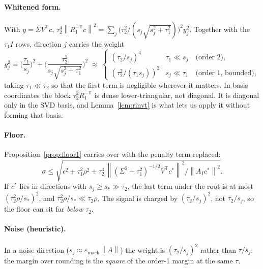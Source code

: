 \documentclass[11pt]{article}
\theoremstyle{definition}
\theoremstyle{remark}
\newcommand{\sig}{\sigma}
\newcommand{\eps}{\varepsilon_{\mathrm{mach}}}
\newcommand{\norm}[1]{\left\lVert #1 \right\rVert}
\newcommand{\AI}{A_I}
\begin{document}
\paragraph{Whitened form.} With $y = \Sigma V^{\mathsf T}c$,
$\tau_2^4\norm{R_1^{-\mathsf T}c}^2 = \sum_j \big(\tau_2^2/(s_j\sqrt{s_j^2+\tau_1^2})\big)^2 y_j^2$.
Together with the $\tau_1 I$ rows, direction $j$ carries the weight
\begin{equation}\label{eq:g2}
  g_j^2 = \Big(\frac{\tau_1}{s_j}\Big)^2
        + \Big(\frac{\tau_2^2}{s_j\sqrt{s_j^2+\tau_1^2}}\Big)^2
  \;\approx\;
  \begin{cases}
    (\tau_2/s_j)^4 & \tau_1 \ll s_j \quad\text{(order 2)},\\[2pt]
    (\tau_2^2/(\tau_1 s_j))^2 & s_j \ll \tau_1 \quad\text{(order 1, bounded)},
  \end{cases}
\end{equation}
taking $\tau_1\ll\tau_2$ so that the first term is negligible wherever it matters. In basis
coordinates the block $\tau_2^2R_1^{-\mathsf T}$ is dense lower-triangular, not diagonal. It is
diagonal only in the SVD basis, and Lemma~\ref{lem:rinvt} is what lets us apply it without forming
that basis.

\paragraph{Floor.} Proposition~\ref{prop:floor1} carries over with the penalty term replaced:
\[
  \sig \le \sqrt{\epsilon^2 + \tau_1^2\rho^2
   + \tau_2^4\,\norm{(\Sigma^2+\tau_1^2)^{-1/2}V^{\mathsf T}c^\ast}^2/\norm{\AI c^\ast}^2 }.
\]
If $c^\ast$ lies in directions with $s_j\ge s_\ast\gg\tau_2$, the last term under the root is at
most $(\tau_2^2\rho/s_\ast)^2$, and $\tau_2^2\rho/s_\ast\ll\tau_2\rho$. The signal is charged by $(\tau_2/s_j)^2$, not
$\tau_2/s_j$, so the floor can sit far \emph{below} $\tau_2$.

\paragraph{Noise (heuristic).} In a noise direction ($s_j\approx\eps\norm{A}$) the weight is
$(\tau_2/s_j)^2$ rather than $\tau/s_j$: the margin over rounding is the \emph{square} of the
order-1 margin at the same $\tau$.
\end{document}
